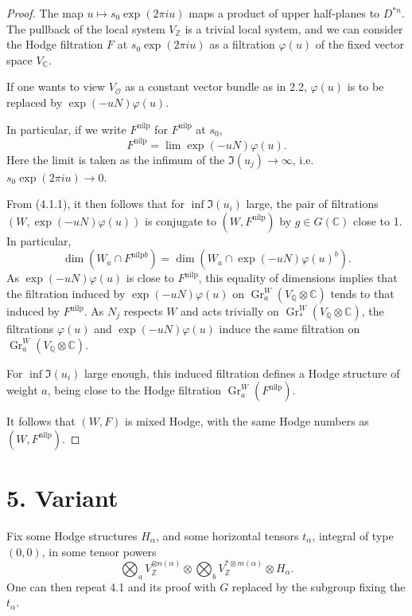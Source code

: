 \documentclass[11pt,a4paper]{article}
\theoremstyle{plain}
\theoremstyle{definition}
\DeclareMathOperator{\Gr}{Gr}
\begin{document}
\begin{proof}
The map $u \mapsto s_{0}\exp(2\pi i u)$ maps a product of upper half-planes to $D^{*n}$. The pullback of the local system $V_{\mathbb{Z}}$ is a trivial local system, and we can consider the Hodge filtration $F$ at $s_{0}\exp(2\pi i u)$ as a filtration $\varphi(u)$ of the fixed vector space $V_{\mathbb{C}}$.

If one wants to view $V_{\mathcal{O}}$ as a constant vector bundle as in 2.2, $\varphi(u)$ is to be replaced by $\exp(-uN)\varphi(u)$.

In particular, if we write $F^{\text{nilp}}$ for $F^{\text{nilp}}$ at $s_{0}$,
\[
F^{\text{nilp}} = \lim \exp(-uN)\varphi(u).
\]
Here the limit is taken as the infimum of the $\Im(u_{j}) \to \infty$, i.e. $s_{0}\exp(2\pi i u) \to 0$.

From (4.1.1), it then follows that for $\inf \Im(u_{i})$ large, the pair of filtrations $(W, \exp(-uN)\varphi(u))$ is conjugate to $(W, F^{\text{nilp}})$ by $g \in G(\mathbb{C})$ close to 1. In particular,
\[
\dim(W_{a} \cap F^{\text{nilp} b}) = \dim(W_{a} \cap \exp(-uN)\varphi(u)^{b}).
\]
As $\exp(-uN)\varphi(u)$ is close to $F^{\text{nilp}}$, this equality of dimensions implies that the filtration induced by $\exp(-uN)\varphi(u)$ on $\Gr_{a}^{W}(V_{\mathbb{Q}} \otimes \mathbb{C})$ tends to that induced by $F^{\text{nilp}}$. As $N_{j}$ respects $W$ and acts trivially on $\Gr_{*}^{W}(V_{\mathbb{Q}} \otimes \mathbb{C})$, the filtrations $\varphi(u)$ and $\exp(-uN)\varphi(u)$ induce the same filtration on $\Gr_{a}^{W}(V_{\mathbb{Q}} \otimes \mathbb{C})$.

For $\inf \Im(u_{i})$ large enough, this induced filtration defines a Hodge structure of weight $a$, being close to the Hodge filtration $\Gr_{a}^{W}(F^{\text{nilp}})$.

It follows that $(W, F)$ is mixed Hodge, with the same Hodge numbers as $(W, F^{\text{nilp}})$.
\end{proof}

\section{5. Variant}

Fix some Hodge structures $H_{\alpha}$, and some horizontal tensors $t_{\alpha}$, integral of type $(0,0)$, in some tensor powers
\[
\bigotimes_{a} V_{\mathbb{Z}}^{\otimes n(\alpha)} \otimes \bigotimes_{b} V_{\mathbb{Z}}^{* \otimes m(\alpha)} \otimes H_{\alpha}.
\]
One can then repeat 4.1 and its proof with $G$ replaced by the subgroup fixing the $t_{\alpha}$.
\end{document}
